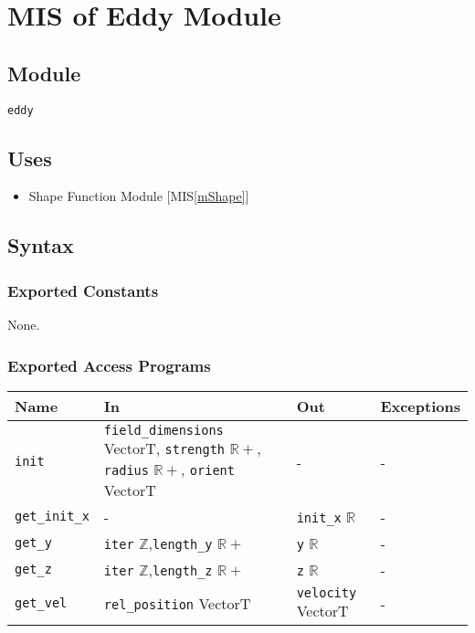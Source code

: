 \documentclass[12pt, titlepage]{article}
\begin{document}
\newpage
\section{MIS of Eddy Module} \label{mEddy} 

\subsection{Module}
\texttt{eddy}

\subsection{Uses}
\begin{itemize}
\item Shape Function Module [MIS\ref{mShape}]
\end{itemize}

\subsection{Syntax}

\subsubsection{Exported Constants}
None.

\subsubsection{Exported Access Programs}

\begin{center}
\begin{tabular}{p{2cm} p{5.6cm} p{3cm} p{3cm}}
\hline
\textbf{Name} & \textbf{In} & \textbf{Out} & \textbf{Exceptions} \\
\hline
\texttt{init} & \texttt{field\_dimensions} VectorT, \newline\texttt{strength} $\mathbb{R+}$, \newline\texttt{radius} $\mathbb{R+}$, \newline\texttt{orient} VectorT & - & - \\
\texttt{get\_init\_x}& - & \texttt{init\_x} $\mathbb{R}$ & - \\
\texttt{get\_y}& \texttt{iter} $\mathbb{Z}$,\newline\texttt{length\_y} $\mathbb{R+}$ & \texttt{y} $\mathbb{R}$ & - \\
\texttt{get\_z}& \texttt{iter} $\mathbb{Z}$,\newline\texttt{length\_z} $\mathbb{R+}$ & \texttt{z} $\mathbb{R}$ & - \\
\texttt{get\_vel}& \texttt{rel\_position} VectorT & \texttt{velocity} VectorT & - \\
\hline
\end{tabular}
\end{center}
\end{document}
